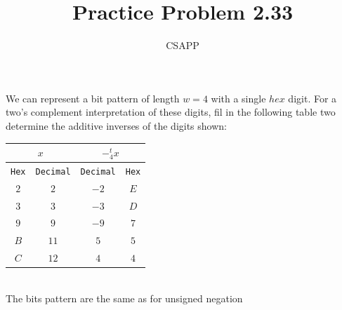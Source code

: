 \documentclass{article}
\title{Practice Problem 2.33}
\author{CSAPP}
\begin{document}
    \maketitle
    \begin{flushleft}
        We can represent a bit pattern of length $w=4$ with a single $hex$ digit. For a 
        two's complement interpretation of these digits, fil in the following table two
        determine the additive inverses of the digits shown:
    \end{flushleft}
    \smallskip

    \begin{center}
        \begin{tabular}{cccc}
            \multicolumn{2}{c}{$x$} & \multicolumn{2}{c}{$-^t_4x$}\\
            \midrule
            \texttt{Hex} & \texttt{Decimal} & \texttt{Decimal} & \texttt{Hex}\\
            \midrule
            $2$ & $2$  & $-2$ &$E$\\
            $3$ & $3$  & $-3$ &$D$\\
            $9$ & $9$  & $-9$ &$7$\\
            $B$ & $11$ & $5$  &$5$\\
            $C$ & $12$ & $4$  &$4$\\
        \end{tabular}
        \\
        The bits pattern are the same as for unsigned negation
    \end{center}
\end{document}
